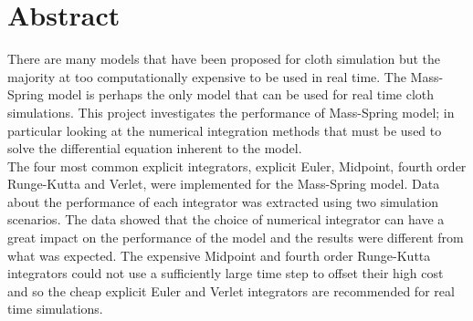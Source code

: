 \chapter*{Abstract}

There are many models that have been proposed for cloth simulation but the majority at too computationally expensive to be used in real time. The Mass-Spring model is perhaps the only model that can be used for real time cloth simulations. This project investigates the performance of Mass-Spring model; in particular looking at the numerical integration methods that must be used to solve the differential equation inherent to the model.
\\The four most common explicit integrators, explicit Euler, Midpoint, fourth order Runge-Kutta and Verlet, were implemented for the Mass-Spring model. Data about the performance of each integrator was extracted using two simulation scenarios. The data showed that the choice of numerical integrator can have a great impact on the performance of the model and the results were different from what was expected. The expensive Midpoint and fourth order Runge-Kutta integrators could not use a sufficiently large time step to offset their high cost and so the cheap explicit Euler and Verlet integrators are recommended for real time simulations.
